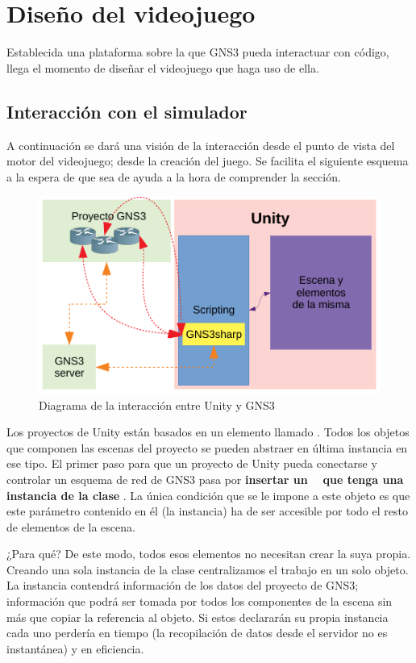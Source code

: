\section{Diseño del videojuego}
Establecida una plataforma sobre la que GNS3 pueda interactuar con código, llega el momento de diseñar el videojuego que haga uso de ella. 

\subsection{Interacción con el simulador}\label{subsec:interac_emul}
A continuación se dará una visión de la interacción desde el punto de vista del motor del videojuego; desde la creación del juego. Se facilita el siguiente esquema a la espera de que sea de ayuda a la hora de comprender la sección.

\begin{figure}[H]
  \centering
  \includegraphics[scale=1.4]{imagenes/diagrama_interaccion}
  \caption{Diagrama de la interacción entre Unity y GNS3}
  \label{fig:diagrama_interaccion}
\end{figure}

Los proyectos de Unity están basados en un elemento llamado \GAOBJ. Todos los objetos que componen las escenas del proyecto se pueden abstraer en última instancia en ese tipo. El primer paso para que un proyecto de Unity pueda conectarse y controlar un esquema de red de GNS3 pasa por \textbf{insertar un \GAOBJ~ que tenga una instancia de la clase \GNSCS}. La única condición que se le impone a este objeto es que este parámetro contenido en él (la instancia) ha de ser accesible por todo el resto de elementos de la escena.

¿Para qué? De este modo, todos esos elementos no necesitan crear la suya propia. Creando una sola instancia de la clase centralizamos el trabajo en un solo objeto. La instancia contendrá información de los datos del proyecto de GNS3; información que podrá ser tomada por todos los componentes de la escena sin más que copiar la referencia al objeto. Si estos declararán su propia instancia cada uno perdería en tiempo (la recopilación de datos desde el servidor no es instantánea) y en eficiencia.

